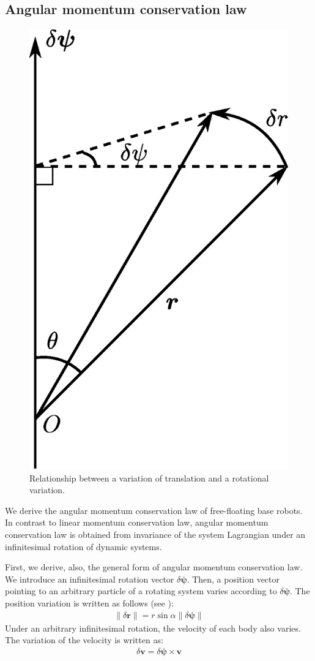 \subsection{Angular momentum conservation law}
%
\begin{figure}[t]
  \centering
  \includegraphics[width=0.3\linewidth]{fig/chapter2/rotation.eps}
  \caption{Relationship between a variation of translation and a rotational variation.}
  \label{fig:ROT}
\end{figure}
%
We derive the angular momentum conservation law of free-floating base robots.
In contrast to linear momentum conservation law,
angular momentum conservation law is obtained from invariance of the system Lagrangian
under an infinitesimal rotation of dynamic systems.

First, we derive, also, the general form of angular momentum conservation law.
We introduce an infinitesimal rotation vector $\delta\bm{\psi}$.
Then, a position vector pointing to an arbitrary particle of a rotating system
varies according to $\delta \bm{\psi}$.
The position variation is written as follows (see ):
%
\begin{align}
  \|\delta \bm{r}\| = r\sin\alpha\|\delta\bm{\psi}\|
\end{align}
%
Under an arbitrary infinitesimal rotation,
the velocity of each body also varies.
The variation of the velocity is written as:
%
\begin{align}
  \delta \bm{v} = \delta\bm{\psi}\times \bm{v}
\end{align}
%


